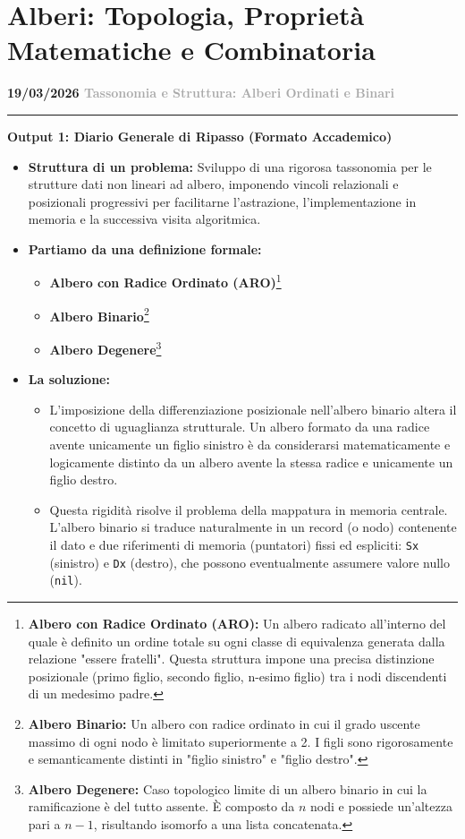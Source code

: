 \documentclass[a4paper, 11pt]{report}
\newcommand{\lezione}[2]{
\vspace{2em}
\noindent\textbf{\Large #1 \hfill \textcolor{darkgray}{#2}}
\vspace{0.5em}
\hrule
\vspace{1.5em}
}
\newcommand{\definizione}[2]{%
\textbf{#1}\footnote{\textbf{#1:} #2}%
}
\begin{document}
\chapter{Alberi: Topologia, Proprietà Matematiche e Combinatoria}

\lezione{19/03/2026}{Tassonomia e Struttura: Alberi Ordinati e Binari}

\vspace{0.5cm}
\textbf{Output 1: Diario Generale di Ripasso (Formato Accademico)}

\begin{itemize}
    \item \textbf{Struttura di un problema:}
    Sviluppo di una rigorosa tassonomia per le strutture dati non lineari ad albero, imponendo vincoli relazionali e posizionali progressivi per facilitarne l'astrazione, l'implementazione in memoria e la successiva visita algoritmica.

    \item \textbf{Partiamo da una definizione formale:}
    \begin{itemize}
        \item \definizione{Albero con Radice Ordinato (ARO)}{Un albero radicato all'interno del quale è definito un ordine totale su ogni classe di equivalenza generata dalla relazione "essere fratelli". Questa struttura impone una precisa distinzione posizionale (primo figlio, secondo figlio, n-esimo figlio) tra i nodi discendenti di un medesimo padre.}
        \item \definizione{Albero Binario}{Un albero con radice ordinato in cui il grado uscente massimo di ogni nodo è limitato superiormente a 2. I figli sono rigorosamente e semanticamente distinti in "figlio sinistro" e "figlio destro".}
        \item \definizione{Albero Degenere}{Caso topologico limite di un albero binario in cui la ramificazione è del tutto assente. È composto da $n$ nodi e possiede un'altezza pari a $n-1$, risultando isomorfo a una lista concatenata.}
    \end{itemize}

    \item \textbf{La soluzione:}
    \begin{itemize}
        \item L'imposizione della differenziazione posizionale nell'albero binario altera il concetto di uguaglianza strutturale. Un albero formato da una radice avente unicamente un figlio sinistro è da considerarsi matematicamente e logicamente distinto da un albero avente la stessa radice e unicamente un figlio destro.
        \item Questa rigidità risolve il problema della mappatura in memoria centrale. L'albero binario si traduce naturalmente in un record (o nodo) contenente il dato e due riferimenti di memoria (puntatori) fissi ed espliciti: \texttt{Sx} (sinistro) e \texttt{Dx} (destro), che possono eventualmente assumere valore nullo (\texttt{nil}).
    \end{itemize}
\end{itemize}
\end{document}
